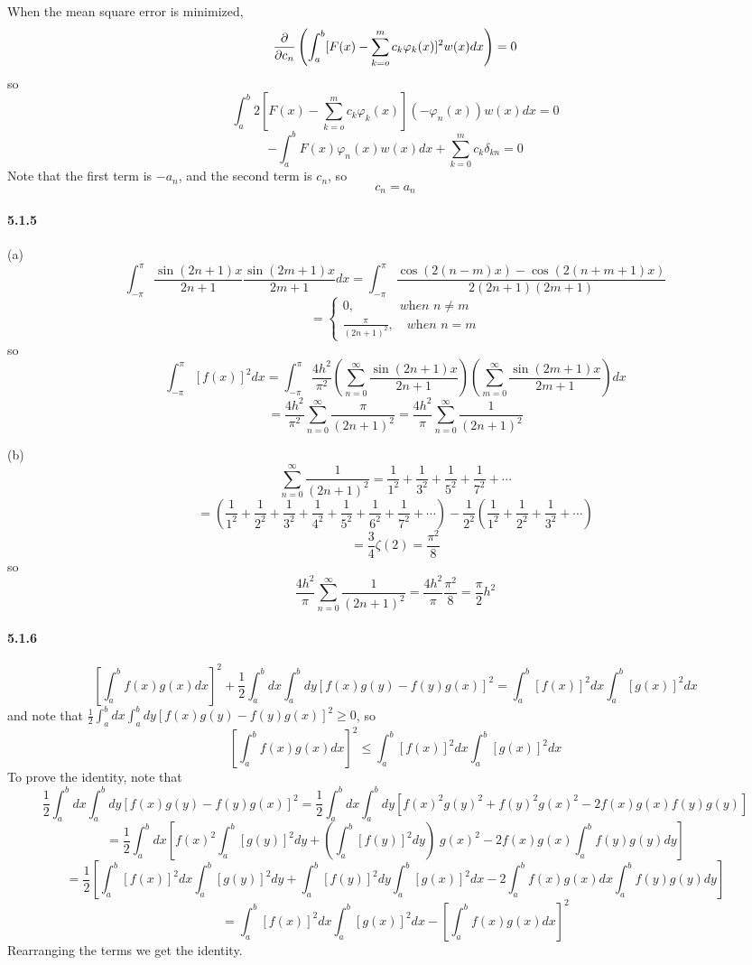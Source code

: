 \documentclass[a4paper]{article}
\begin{document}
When the mean square error is minimized, 
\[
\frac{\partial}{\partial c_n}\left(\int_a^b[F(x)-\sum_{k=o}^mc_k\varphi_k(x)]^2w(x)dx \right)=0
\]
so
\[
\int_a^b 2[F(x)-\sum_{k=o}^mc_k\varphi_k(x)](-\varphi_n(x))w(x)dx=0
\]
\[
-\int_a^bF(x)\varphi_n(x)w(x)dx+\sum_{k=0}^mc_k\delta_{kn}=0
\]
Note that the first term is $-a_n$, and the second term is $c_n$, so
\[
c_n=a_n
\]

\paragraph{5.1.5}
(a)
\[
\int_{-\pi}^\pi\frac{\sin(2n+1)x}{2n+1}\frac{\sin(2m+1)x}{2m+1}dx=\int_{-\pi}^\pi\frac{\cos(2(n-m)x)-\cos(2(n+m+1)x)}{2(2n+1)(2m+1)}
\]
\[=
\begin{cases}
0,\quad\quad\quad\;\;\textit{when $n\neq m$}\\
\frac{\pi}{(2n+1)^2},\quad\textit{when $n=m$}
\end{cases}
\]
so
\[
\int_{-\pi}^\pi\left[f(x)\right]^2dx=\int_{-\pi}^\pi\frac{4h^2}{\pi^2}(\sum_{n=0}^\infty\frac{\sin(2n+1)x}{2n+1})(\sum_{m=0}^\infty\frac{\sin(2m+1)x}{2m+1})dx
\]
\[
=\frac{4h^2}{\pi^2}\sum_{n=0}^\infty\frac{\pi}{(2n+1)^2}=\frac{4h^2}{\pi}\sum_{n=0}^\infty\frac{1}{(2n+1)^2}
\]

(b)
\[
\sum_{n=0}^\infty\frac{1}{(2n+1)^2}=\frac{1}{1^2}+\frac{1}{3^2}+\frac{1}{5^2}+\frac{1}{7^2}+\cdots
\]
\[
=(\frac{1}{1^2}+\frac{1}{2^2}+\frac{1}{3^2}+\frac{1}{4^2}+\frac{1}{5^2}+\frac{1}{6^2}+\frac{1}{7^2}+\cdots)-\frac{1}{2^2}(\frac{1}{1^2}+\frac{1}{2^2}+\frac{1}{3^2}+\cdots)
\]
\[
=\frac{3}{4}\zeta(2)=\frac{\pi^2}{8}
\]
so
\[
\frac{4h^2}{\pi}\sum_{n=0}^\infty\frac{1}{(2n+1)^2}=\frac{4h^2}{\pi}\frac{\pi^2}{8}=\frac{\pi}{2}h^2
\]

\paragraph{5.1.6}
\[
\left[\int_a^bf(x)g(x)dx \right]^2+\frac{1}{2}\int_a^bdx\int_a^bdy\left[f(x)g(y)-f(y)g(x) \right]^2=\int_a^b\left[f(x) \right]^2dx\int_a^b\left[g(x) \right]^2dx
\]
and note that $\frac{1}{2}\int_a^bdx\int_a^bdy\left[f(x)g(y)-f(y)g(x) \right]^2\geq0$, so
\[
\left[\int_a^bf(x)g(x)dx \right]^2\leq\int_a^b\left[f(x) \right]^2dx\int_a^b\left[g(x) \right]^2dx
\]
To prove the identity, note that
\[
\frac{1}{2}\int_a^bdx\int_a^bdy\left[f(x)g(y)-f(y)g(x) \right]^2=\frac{1}{2}\int_a^bdx\int_a^bdy\left[f(x)^2g(y)^2+f(y)^2g(x)^2-2f(x)g(x)f(y)g(y) \right]
\]
\[=
\frac{1}{2}\int_a^bdx\left[f(x)^2\int_a^b[g(y)]^2dy+(\int_a^b[f(y)]^2dy)\;g(x)^2-2f(x)g(x)\int_a^bf(y)g(y)dy \right]
\]
\[
=\frac{1}{2}\left[\int_a^b[f(x)]^2dx\int_a^b[g(y)]^2dy+\int_a^b[f(y)]^2dy\int_a^b[g(x)]^2dx-2\int_a^bf(x)g(x)dx\int_a^bf(y)g(y)dy \right]
\]
\[
=\int_a^b[f(x)]^2dx\int_a^b[g(x)]^2dx-\left[\int_a^bf(x)g(x)dx\right]^2
\]
Rearranging the terms we get the identity.
\end{document}
